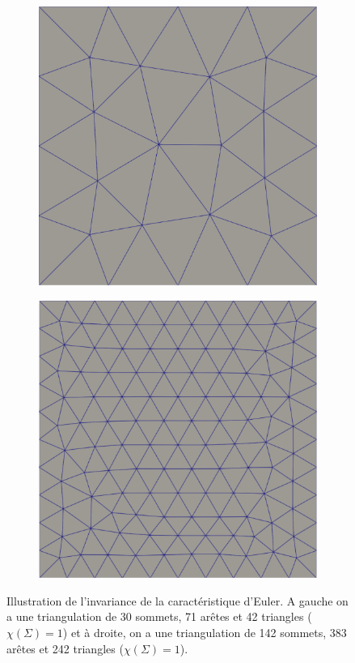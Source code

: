 \begin{figure}[!h]
\begin{subfigure}{0.5\textwidth}
    \includegraphics[width=\textwidth]{images/carre_euler_1.pdf}
\end{subfigure}
\hfill
\begin{subfigure}{0.5\textwidth}
    \includegraphics[width=\textwidth]{images/carre_euler_2.pdf}
\end{subfigure}
\caption{Illustration de l'invariance de la caractéristique d'Euler. A gauche on a une triangulation de 30 sommets, 71 arêtes et 42 triangles ($\chi(\Sigma)=1$) et à droite, on a une triangulation de 142 sommets, 383 arêtes et 242 triangles ($\chi(\Sigma)=1$).}
\label{fig:carre_euler}
\end{figure}
